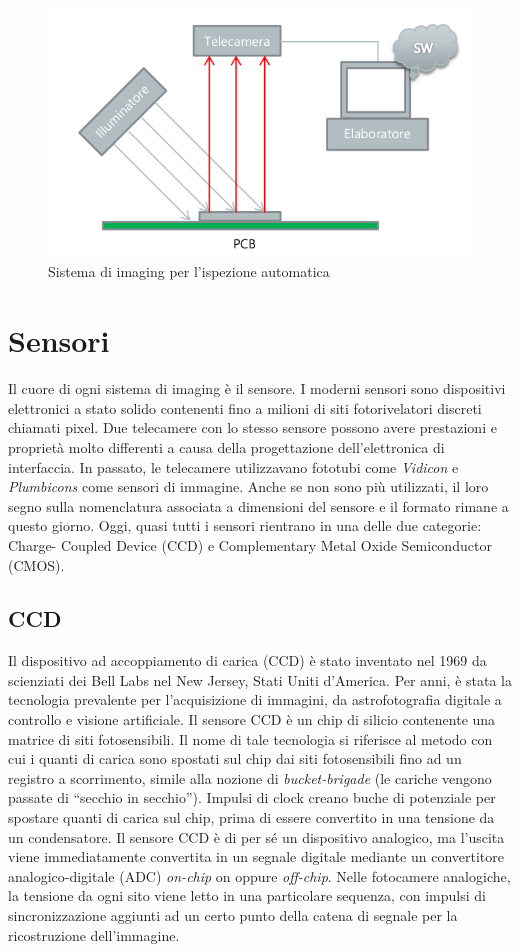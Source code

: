 
\begin{figure}[!ht]
\centering

\includegraphics[width=.6\textwidth]{img/imaging.png}

\caption{Sistema di imaging per l'ispezione automatica}
\label{fig:ccd-blockdiagram}
\end{figure}

\section{Sensori}

Il cuore di ogni sistema di imaging è il sensore. I moderni sensori sono
dispositivi elettronici a stato solido contenenti fino a milioni di siti
fotorivelatori discreti chiamati pixel. Due telecamere con lo stesso sensore
possono avere prestazioni e proprietà molto differenti a causa della
progettazione dell'elettronica di interfaccia. In passato, le telecamere
utilizzavano fototubi come \emph{Vidicon} e \emph{Plumbicons} come sensori di immagine.
Anche se non sono più utilizzati, il loro segno sulla nomenclatura associata a
dimensioni del sensore e il formato rimane a questo giorno. Oggi, quasi tutti
i sensori rientrano in una delle due categorie: Charge- Coupled Device (CCD) e
Complementary Metal Oxide Semiconductor (CMOS).

\subsection{CCD} 
Il dispositivo ad accoppiamento di carica (CCD) è stato
inventato nel 1969 da scienziati dei Bell Labs nel New Jersey, Stati Uniti
d'America. Per anni, è stata la tecnologia prevalente per l'acquisizione di
immagini, da astrofotografia digitale a controllo e visione artificiale. Il
sensore CCD è un chip di silicio contenente una matrice di siti
fotosensibili. Il nome di tale tecnologia si riferisce al metodo con cui i
quanti di carica sono spostati sul chip dai siti fotosensibili fino ad un
registro a scorrimento, simile alla nozione di \emph{bucket-brigade} (le cariche
vengono passate di ``secchio in secchio''). Impulsi di clock creano buche di
potenziale per spostare quanti di carica sul chip, prima di essere convertito
in una tensione da un condensatore. Il sensore CCD è di per sé un dispositivo
analogico, ma l'uscita viene immediatamente convertita in un segnale digitale
mediante un convertitore analogico-digitale (ADC) \emph{on-chip} on oppure \emph{off-chip}.
Nelle fotocamere analogiche, la tensione da ogni sito viene letto in una
particolare sequenza, con impulsi di sincronizzazione aggiunti ad un certo
punto della catena di segnale per la ricostruzione dell'immagine.

